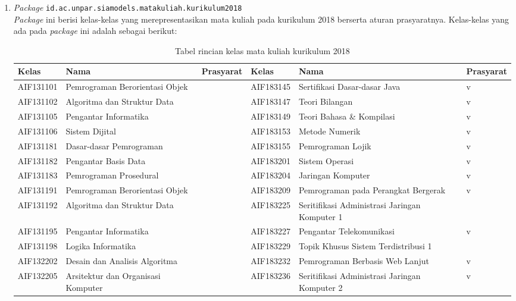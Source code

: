\begin{enumerate}
	\item \textit{Package} \texttt{id.ac.unpar.siamodels.matakuliah.kurikulum2018} \\
	\textit{Package} ini berisi kelas-kelas yang merepresentasikan mata kuliah pada kurikulum 2018 berserta aturan prasyaratnya. Kelas-kelas yang ada pada \textit{package} ini adalah sebagai berikut:
	\begin{table}[H]
\centering
\caption{Tabel rincian kelas mata kuliah kurikulum 2018}
\label{tab:kelasmatakuliah2018_rincian}
\begin{tabular}{|p{2cm}|p{3.5cm}|p{1.75cm}|p{2cm}|p{3.5cm}|p{1.75cm}|}
\hline
\textbf{Kelas} & \textbf{Nama} & \textbf{Prasyarat} & \textbf{Kelas} & \textbf{Nama} & \textbf{Prasyarat} \\ \hline
AIF131101 & Pemrograman Berorientasi Objek &  & AIF183145 & Sertifikasi Dasar-dasar Java & v \\ \hline
AIF131102 & Algoritma dan Struktur Data &  & AIF183147 & Teori Bilangan & v \\ \hline
AIF131105 & Pengantar Informatika &  & AIF183149 & Teori Bahasa \& Kompilasi & v \\ \hline
AIF131106 & Sistem Dijital &  & AIF183153 & Metode Numerik & v \\ \hline
AIF131181 & Dasar-dasar Pemrograman &  & AIF183155 & Pemrograman Lojik & v \\ \hline
AIF131182 & Pengantar Basis Data &  & AIF183201 & Sistem Operasi & v \\ \hline
AIF131183 & Pemrograman Prosedural &  & AIF183204 & Jaringan Komputer & v \\ \hline
AIF131191 & Pemrograman Berorientasi Objek &  & AIF183209 & Pemrograman pada Perangkat Bergerak & v \\ \hline
AIF131192 & Algoritma dan Struktur Data & & AIF183225 & Seritifikasi Administrasi Jaringan Komputer 1 & \\ \hline
AIF131195 & Pengantar Informatika &  & AIF183227 & Pengantar Telekomunikasi & v \\ \hline
AIF131198 & Logika Informatika & & AIF183229 & Topik Khusus Sistem Terdistribusi 1 & \\ \hline
AIF132202 & Desain dan Analisis Algoritma &  & AIF183232 & Pemrograman Berbasis Web Lanjut & v \\ \hline
AIF132205 & Arsitektur dan Organisasi Komputer &  & AIF183236 & Seritifikasi Administrasi Jaringan Komputer 2 & v \\ \hline

\end{tabular}
\end{table}
\end{enumerate}
